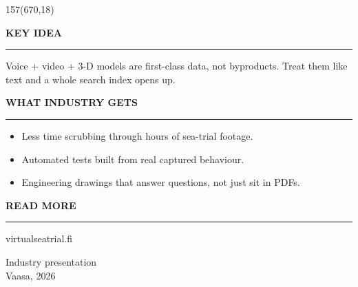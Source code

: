 \documentclass{article}
\newcommand{\panelhead}[1]{%
  \par\addvspace{6mm}%
  {\headingfont\bfseries\fontsize{15pt}{18pt}\selectfont
   \MakeUppercase{#1}\par}%
  \nopagebreak\vspace{1mm}%
  \textcolor{accent}{\rule{32mm}{1.5pt}}\par
  \vspace{2mm}%
}
\begin{document}
\begin{textblock}{157}(670,18)            %
  \color{paneltext}\fontsize{12pt}{16pt}\selectfont\RaggedRight

  \panelhead{Key Idea}
  Voice + video + 3-D models are first-class data, not byproducts.
  Treat them like text and a whole search index opens up.

  \panelhead{What Industry Gets}
  \begin{itemize}\setlength{\itemsep}{2pt}\setlength{\parsep}{1pt}
    \item Less time scrubbing through hours of sea-trial footage.
    \item Automated tests built from real captured behaviour.
    \item Engineering drawings that answer questions, not just sit in PDFs.
  \end{itemize}

  \panelhead{Read More}
  \vspace{2mm}
  \begin{center}
  \end{center}
  \vspace{1mm}
  \centering virtualseatrial.fi

  \vfill
  {\color{panelmuted}\fontsize{9pt}{12pt}\selectfont
   Industry presentation\\Vaasa, 2026\par}
\end{textblock}
\end{document}
